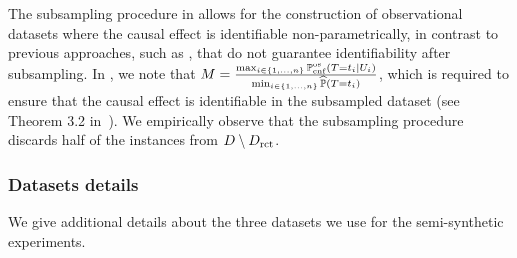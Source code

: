 The subsampling procedure in  allows for the construction of observational datasets where the causal effect is identifiable non-parametrically, in contrast to previous approaches, such as \citep{gentzel2021and}, that do not guarantee identifiability after subsampling. In , 
we note that  $M=\frac{\max _{i \in\{1, \ldots, n\}} \mathbb{P}_{\operatorname{cnf}}^{\operatorname{os}}\left(T=t_i \mid U_i\right)}{\min _{i \in\{1, \ldots, n\}} \widehat{\mathbb{P}}\left(T=t_i\right)}$, which is required to ensure that the causal effect is identifiable in the subsampled dataset (see Theorem 3.2 in~\cite{keith2023rct}). 
We empirically observe that the subsampling procedure discards half of the instances from  $D \setminus D_{\operatorname{rct}}$. 



\subsubsection{Datasets details}
\label{apx:dataset_details}

We give additional details about the three datasets we use for the semi-synthetic experiments.

